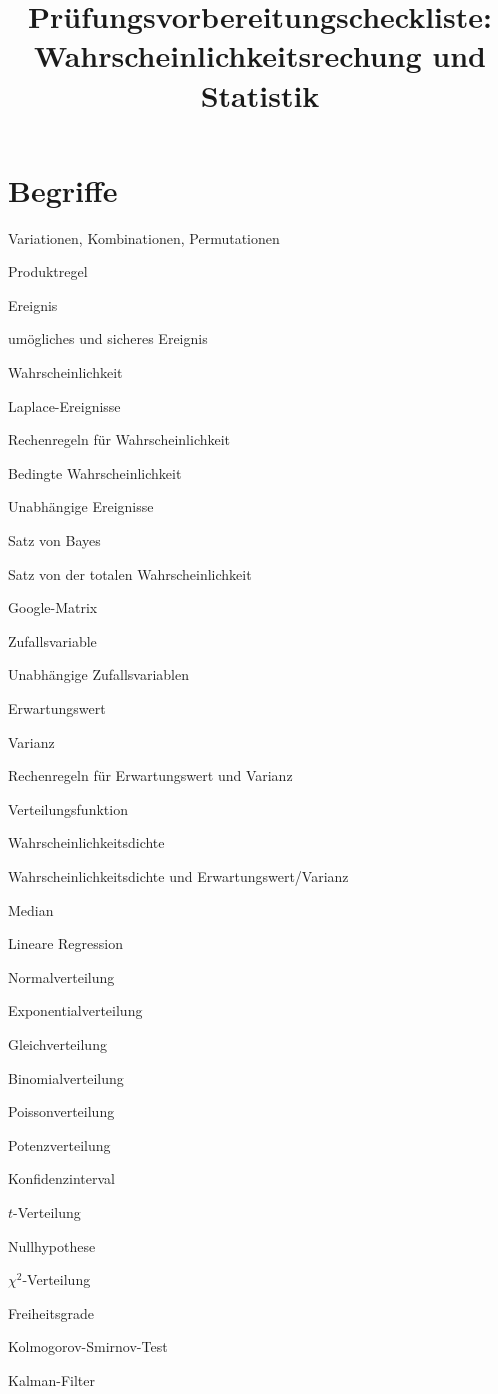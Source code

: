 \documentclass[a4paper,12pt,twocolumn]{article}
\begin{document}
\title{Prüfungsvorbereitungscheckliste:\\ Wahrscheinlichkeitsrechung und Statistik}
\date{}
\maketitle
\section{Begriffe}
\begin{compactenum}
\item Variationen, Kombinationen, Permutationen
\item Produktregel
\item Ereignis
\item umögliches und sicheres Ereignis
\item Wahrscheinlichkeit
\item Laplace-Ereignisse
\item Rechenregeln für Wahrscheinlichkeit
\item Bedingte Wahrscheinlichkeit
\item Unabhängige Ereignisse
\item Satz von Bayes
\item Satz von der totalen Wahrscheinlichkeit
\item Google-Matrix
\item Zufallsvariable
\item Unabhängige Zufallsvariablen
\item Erwartungswert
\item Varianz
\item Rechenregeln für Erwartungswert und Varianz
\item Verteilungsfunktion
\item Wahrscheinlichkeitsdichte
\item Wahrscheinlichkeitsdichte und Erwartungswert/Varianz
\item Median
\item Lineare Regression
\item Normalverteilung
\item Exponentialverteilung
\item Gleichverteilung
\item Binomialverteilung
\item Poissonverteilung
\item Potenzverteilung
\item Konfidenzinterval
\item $t$-Verteilung
\item Nullhypothese
\item $\chi^2$-Verteilung
\item Freiheitsgrade
\item Kolmogorov-Smirnov-Test
\item Kalman-Filter
\end{compactenum}
\vfill
\end{document}
